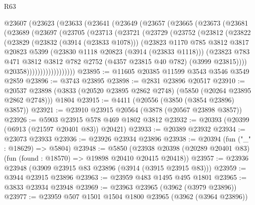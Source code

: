 \begin{lexlean}{R63}
\begin{coremodule}
    @23607
      (@23623
        (@23633
          (@23641
            (@23649
              (@23657
                (@23665
                  (@23673
                    (@23681
                      (@23689
                        (@23697
                          (@23705
                            (@23713
                              (@23721
                                (@23729
                                  (@23752
                                    (@23812
                                      (@23822
                                        (@23829
                                          (@23832 (@3914 (@23833 @1078)))
                                          (@23823
                                            @1170
                                            @785
                                            @3812
                                            @3817
                                            @20823
                                            @5399
                                            (@23830 @1118 @20823 (@3914 (@23833 @1118)))
                                            (@23823
                                              @783
                                              @471
                                              @3812
                                              @3812
                                              @782
                                              @2752
                                              (@4357 @23815 @40 @782)
                                              (@3999 @23815))))
                                        @20358))))))))))))))))))
@23895 := @11605 @20385 @11599 @3543 @3546 @3549 @2859
@23896 := @3743 @23895
@23898 := @2831 @23896 @20517
@23910 := @20537
    @23898
    (@3833 (@20520 @23895 @2862 @2748) (@5850 (@20264 @23895 @2862 @2748)))
    @1804
@23915 := @4411 (@20556 (@3850 (@3854 @23896) @3857))
@23921 := @23910 @23915 @20564 (@3878 (@20567 @23898 @3857))
@23926 := @5903 @23915 @578 @469 @1802 @3812
@23932 := @20393 (@20399 (@6913 (@21597 @20401 @83)) @20421)
@23933 := @20389 @23932
@23934 := @23073 @23933
@23936 := @23926 @23934 @23896
@23938 := @20394 (fun ("_" : @18629) => @5804)
@23948 := @5850
    (@23938 @20398 (@20289 @20401 @83) (fun (found : @18570) => @19898 @20410 @20415 @20418))
@23957 := @23936 @23948 (@3909 @23915 @83 @23896 (@3914 (@3915 @23915 @83)))
@23959 := @3944 @23915 @23896
@23963 := @23959 @483 @1495 @495 @1801
@23965 := @3833 @23934 @23948
@23969 := @23963 @23965 (@3962 (@3979 @23896))
@23977 := @23959 @507 @1501 @1504 @1800 @23965 (@3962 (@3964 @23896))

\end{coremodule}
\end{lexlean}
